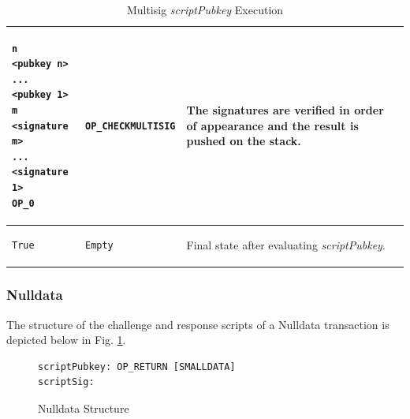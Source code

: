\begin{table}[!ht]
\begin{minipage}{\textwidth}
\begin{tabular}{| m{95pt} | m{145pt} | m{100pt} |}
\vspace{8pt}
\begin{BVerbatim}[fontsize==\relsize{-4}]
n
<pubkey n>
...
<pubkey 1>
m
<signature m>
...
<signature 1>
OP_0
\end{BVerbatim}
\vspace{4pt}
&
\vspace{8pt}
\begin{BVerbatim}[fontsize==\relsize{-4}]
OP_CHECKMULTISIG
\end{BVerbatim} 
\vspace{4pt}
&
The signatures are verified in order of appearance and the result is pushed on the stack.\\ \hline	


\vspace{8pt}
\begin{BVerbatim}[fontsize==\relsize{-4}]
True
\end{BVerbatim}
\vspace{4pt}
&
\vspace{8pt}
\begin{BVerbatim}[fontsize==\relsize{-4}]
Empty
\end{BVerbatim} 
\vspace{4pt}
&
Final state after evaluating \textit{scriptPubkey}.\\ \hline

\end{tabular}
\vspace{5pt}
\caption{Multisig \textit{scriptPubkey} Execution}
\label{tab:P2Multisig2}

\end{minipage}
\end{table}

\clearpage
\subsubsection{Nulldata}
The structure of the challenge and response scripts of a Nulldata transaction is depicted below in Fig. \ref{fig:Nulldata}.

\vspace{-10pt}
\begin{figure}[htbp]

\begin{Verbatim}[fontsize==\relsize{-4}, frame=single]  
scriptPubkey: OP_RETURN [SMALLDATA]
scriptSig:    
\end{Verbatim}

\vspace{-15pt}
\caption{Nulldata Structure}
\label{fig:Nulldata}
\end{figure}
\vspace{-10pt}

